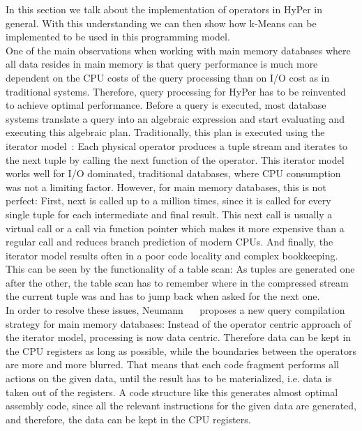 In this section we talk about the implementation of operators in HyPer in general. With this understanding we can then show how k-Means can be implemented to be used in this programming model. 
\\
One of the main observations when working with main memory databases where all data resides in main memory is that query performance is much more dependent on the CPU costs of the query processing than on I/O cost as in traditional systems. Therefore, query processing for HyPer has to be reinvented to achieve optimal performance.
Before a query is executed, most database systems translate a query into an algebraic expression and start evaluating and executing this algebraic plan. Traditionally, this plan is executed using the iterator model~\parencite{iterator}: Each physical operator produces a tuple stream and iterates to the next tuple by calling the next function of the operator. This iterator model works well for I/O dominated, traditional databases, where CPU consumption was not a limiting factor. However, for main memory databases, this is not perfect: First, next is called up to a million times, since it is called for every single tuple for each intermediate and final result. This next call is usually a virtual call or a call via function pointer which makes it more expensive than a regular call and reduces branch prediction of modern CPUs. And finally, the iterator model results often in a poor code locality and complex bookkeeping. This can be seen by the functionality of a table scan: As tuples are generated one after the other, the table scan has to remember where in the compressed stream the current tuple was and has to jump back when asked for the next one. 
\\
In order to resolve these issues, Neumann~\parencite{neumann} ~\parencite{neumann+leis} proposes a new query compilation strategy for main memory databases: Instead of the operator centric approach of the iterator model, processing is now data centric. Therefore data can be kept in the CPU registers as long as possible, while the boundaries between the operators are more and more blurred. That means that each code fragment performs all actions on the given data, until the result has to be materialized, i.e. data is taken out of the registers. A code structure like this generates almost optimal assembly code, since all the relevant instructions for the given data are generated, and therefore, the data can be kept in the CPU registers.
\\
